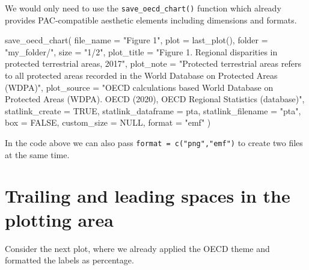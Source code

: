 \documentclass[
  11pt,
  oneside]{report}
\newenvironment{Shaded}{\begin{snugshade}}{\end{snugshade}}
\newcommand{\AttributeTok}[1]{\textcolor[rgb]{0.77,0.63,0.00}{#1}}
\newcommand{\ConstantTok}[1]{\textcolor[rgb]{0.00,0.00,0.00}{#1}}
\newcommand{\FunctionTok}[1]{\textcolor[rgb]{0.00,0.00,0.00}{#1}}
\newcommand{\NormalTok}[1]{#1}
\newcommand{\StringTok}[1]{\textcolor[rgb]{0.31,0.60,0.02}{#1}}
\begin{document}
We would only need to use the \texttt{save\_oecd\_chart()} function
which already provides PAC-compatible aesthetic elements including
dimensions and formats.

\begin{Shaded}
\begin{Highlighting}[]
\FunctionTok{save\_oecd\_chart}\NormalTok{(}
  \AttributeTok{file\_name =} \StringTok{"Figure 1"}\NormalTok{,}
  \AttributeTok{plot =} \FunctionTok{last\_plot}\NormalTok{(),}
  \AttributeTok{folder =} \StringTok{"my\_folder/"}\NormalTok{,}
  \AttributeTok{size =} \StringTok{"1/2"}\NormalTok{,}
  \AttributeTok{plot\_title =} \StringTok{"Figure 1. Regional disparities in protected terrestrial areas, 2017"}\NormalTok{,}
  \AttributeTok{plot\_note =} \StringTok{"Protected terrestrial areas refers to all protected areas recorded }
\StringTok{   in the World Database on Protected Areas (WDPA)"}\NormalTok{,}
  \AttributeTok{plot\_source =} \StringTok{"OECD calculations based World Database on Protected Areas (WDPA). }
\StringTok{   OECD (2020), OECD Regional Statistics (database)"}\NormalTok{,}
  \AttributeTok{statlink\_create =} \ConstantTok{TRUE}\NormalTok{,}
  \AttributeTok{statlink\_dataframe =}\NormalTok{ pta,}
  \AttributeTok{statlink\_filename =} \StringTok{"pta"}\NormalTok{,}
  \AttributeTok{box =} \ConstantTok{FALSE}\NormalTok{,}
  \AttributeTok{custom\_size =} \ConstantTok{NULL}\NormalTok{,}
  \AttributeTok{format =} \StringTok{"emf"}
\NormalTok{)}
\end{Highlighting}
\end{Shaded}

In the code above we can also pass \texttt{format\ =\ c("png","emf")} to
create two files at the same time.

\hypertarget{trailing-and-leading-spaces-in-the-plotting-area}{%
\section{Trailing and leading spaces in the plotting
area}\label{trailing-and-leading-spaces-in-the-plotting-area}}

Consider the next plot, where we already applied the OECD theme and
formatted the labels as percentage.
\end{document}
